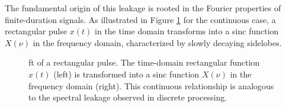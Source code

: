 The fundamental origin of this leakage is rooted in the Fourier properties of finite-duration signals. As illustrated in Figure \ref{fig:rectangular_fourier} for the continuous case, a rectangular pulse $x(t)$ in the time domain transforms into a sinc function $X(\nu)$ in the frequency domain, characterized by slowly decaying sidelobes.

\begin{figure}[t]
    \centering
    \caption[Fourier transform of a rectangular pulse]{\gls{ft} of a rectangular pulse. The time-domain rectangular function $x(t)$ (left) is transformed into a sinc function $X(\nu)$ in the frequency domain (right). This continuous relationship is analogous to the spectral leakage observed in discrete processing.}
    \label{fig:rectangular_fourier}
\end{figure}

